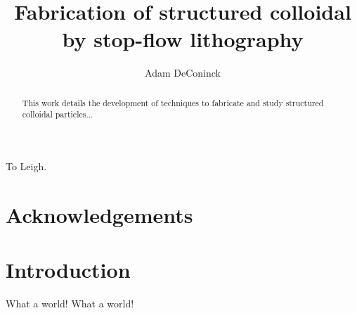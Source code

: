 \documentclass[draftthesis,fullpage]{uiucthesis2009}
\begin{document}
\msthesis
{}
\title{Fabrication of structured colloidal by stop-flow lithography}
\author{Adam DeConinck}

\maketitle

\frontmatter

\begin{abstract}
This work details the development of techniques to fabricate and study structured colloidal particles...
\end{abstract}

\begin{dedication}
To Leigh.
\end{dedication}

\chapter*{Acknowledgements}

\tableofcontents
\listoffigures

\mainmatter

\chapter{Introduction}

What a world!  What a world!
\end{document}
